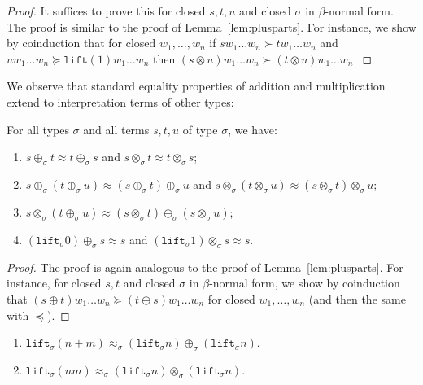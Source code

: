 \documentclass[runningheads,a4paper]{llncs}
\newcommand{\lift}{\mathtt{lift}}
\begin{document}
\begin{proof}
  It suffices to prove this for closed $s,t,u$ and closed $\sigma$ in
  $\beta$-normal form. The proof is similar to the proof of
  Lemma~\ref{lem:plusparts}. For instance, we show by coinduction that
  for closed $w_1,\ldots,w_n$ if $s w_1 \ldots w_n \succ t w_1 \ldots
  w_n$ and $u w_1 \ldots w_n \succeq \lift(1) w_1 \ldots w_n$ then $(s
  \otimes u) w_1 \ldots w_n \succ (t \otimes u) w_1 \ldots w_n$.
\end{proof}

We observe that standard equality properties of addition and
multiplication extend to interpretation terms of other types:

\begin{lemma}\label{lem:approxproperties}
For all types $\sigma$ and all terms $s,t,u$ of type $\sigma$, we
have:
\begin{enumerate}
\item\label{lem:approx:symmetry} $s \oplus_\sigma t \approx t
  \oplus_\sigma s$ and $s \otimes_\sigma t \approx t \otimes_\sigma
  s$;
\item\label{lem:approx:assoc} $s \oplus_\sigma (t \oplus_\sigma u)
  \approx (s \oplus_\sigma t) \oplus_\sigma u$ and $s \otimes_\sigma
  (t \otimes_\sigma u) \approx (s \otimes_\sigma t) \otimes_\sigma u$;
\item\label{lem:approx:distribution} $s \otimes_\sigma (t
  \oplus_\sigma u) \approx (s \otimes_\sigma t) \oplus_\sigma (s
  \otimes_\sigma u)$;
\item\label{lem:approx:neutral} $(\lift_\sigma 0) \oplus_\sigma s
  \approx s$ and $(\lift_\sigma 1) \otimes_\sigma s \approx s$.
\end{enumerate}
\end{lemma}

\begin{proof}
  The proof is again analogous to the proof of
  Lemma~\ref{lem:plusparts}. For instance, for closed $s,t$ and closed
  $\sigma$ in $\beta$-normal form, we show by coinduction that $(s
  \oplus t) w_1 \ldots w_n \succeq (t \oplus s) w_1 \ldots w_n$ for
  closed $w_1,\ldots,w_n$ (and then the same with $\preceq$).
\end{proof}

\begin{lemma}
  \begin{enumerate}
  \item $\lift_\sigma(n+m) \approx_\sigma (\lift_\sigma n)
    \oplus_\sigma (\lift_\sigma n)$.
  \item $\lift_\sigma(n m) \approx_\sigma (\lift_\sigma n)
    \otimes_\sigma (\lift_\sigma n)$.
  \end{enumerate}
\end{lemma}
\end{document}
